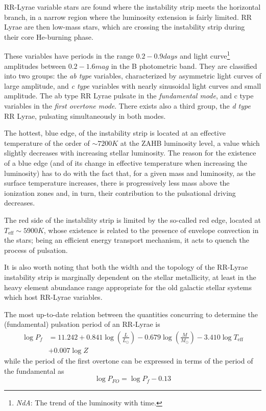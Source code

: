 RR-Lyrae variable stars are found where the instability strip meets the horizontal branch, in a narrow region where the luminosity extension is fairly limited. RR Lyrae are then low-mass stars, which are crossing the instability strip during their core He-burning phase.
\par These variables have periods in the range $0.2-0.9\unit{days}$ and light curve\footnote{\emph{NdA}: The trend of the luminosity with time.} amplitudes between $0.2-1.6\unit{mag}$ in the B photometric band. They are classified into two groups: the \emph{ab type} variables, characterized by asymmetric light curves of large amplitude, and \emph{c type} variables with nearly sinusoidal light curves and small amplitude. The ab type RR Lyrae pulsate in the \emph{fundamental mode}, and c type variables in the \emph{first overtone mode}. There exists also a third group, the \emph{d type} RR Lyrae, pulsating simultaneously in both modes.
\par The hottest, blue edge, of the instability strip is located at an effective temperature of the order of $\sim 7200\unit{K}$ at the ZAHB luminosity level, a value which slightly decreases with increasing stellar luminosity. The reason for the existence of a blue edge (and of its change in effective temperature when increasing the luminosity) has to do with the fact that, for a given mass and luminosity, as the surface temperature increases, there is progressively less mass above the ionization zones and, in turn, their contribution to the pulsational driving decreases.
\par The red side of the instability strip is limited by the so-called red edge, located at $T_{\text{eff}} \sim 5900\unit{K}$, whose existence is related to the presence of envelope convection in the stars; being an efficient energy transport mechanism, it acts to quench the process of pulsation.
\par It is also worth noting that both the width and the topology of the RR-Lyrae instability strip is marginally dependent on the stellar metallicity, at least in the heavy element abundance range appropriate for the old galactic stellar systems which host RR-Lyrae variables.
\par The most up-to-date relation between the quantities concurring to determine the (fundamental) pulsation period of an RR-Lyrae is 
\begin{align*}
    \log P_{f} &= 11.242 +0.841\log\left(\frac{L}{L_{\odot}}\right)-0.679\log\left(\frac{M}{M_{\odot}}\right)-3.410\log T_{\text{eff}}\\
    &+0.007\log Z
\end{align*}
while the period of the first overtone can be expressed in terms of the period of the fundamental as 
\begin{equation*}
    \log P_{FO} = \log P_{f} -0.13
\end{equation*}

